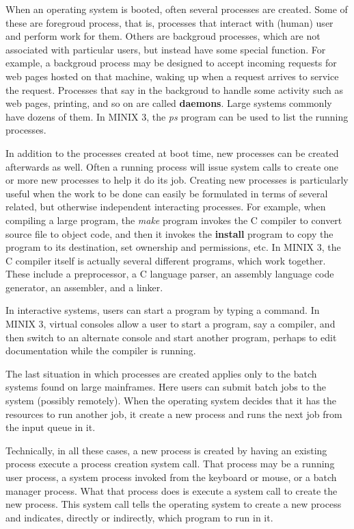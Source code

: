 \documentclass{book}
\newcommand {\kw}  [1] {\textbf{#1}}
\newcommand {\sys} [1] {\textsl{#1}}
\begin{document}
When an operating system is booted, often several processes are created.
Some of these are foregroud process, that is, processes that interact with (human) user and perform work for them.
Others are backgroud processes, which are not associated with particular users, but instead have some special function.
For example, a backgroud process may be designed to accept incoming requests for web pages hosted on that machine,
waking up when a request arrives to service the request.
Processes that say in the backgroud to handle some activity such as web pages, printing, and so on are called \kw{daemons}.
Large systems commonly have dozens of them.
In MINIX 3, the \sys{ps} program can be used to list the running processes.

In addition to the processes created at boot time, new processes can be created afterwards as well.
Often a running process will issue system calls to create one or more new processes to help it do its job.
Creating new processes is particularly useful when the work to be done can easily be formulated in terms of several related,
but otherwise independent interacting processes.
For example, when compiling a large program, the \sys{make} program invokes the C compiler to convert source file to object code,
and then it invokes the \kw{install} program to copy the program to its destination, 
set ownership and permissions, etc.
In MINIX 3, the C compiler itself is actually several different programs, which work together.
These include a preprocessor, a C language parser, an assembly language code generator, an assembler, and a linker.

In interactive systems, users can start a program by typing a command.
In MINIX 3, virtual consoles allow a user to start a program, say a compiler, 
and then switch to an alternate console and start another program,
perhaps to edit documentation while the compiler is running.

The last situation in which processes are created applies only to the batch systems found on large mainframes.
Here users can submit batch jobs to the system (possibly remotely).
When the operating system decides that it has the resources to run another job,
it create a new process and runs the next job from the input queue in it.

Technically, in all these cases, a new process is created by having an existing process execute a process creation system call.
That process may be a running user process, 
a system process invoked from the keyboard or mouse,
or a batch manager process.
What that process does is execute a system call to create the new process.
This system call tells the operating system to create a new process and indicates, directly or indirectly,
which program to run in it.
\end{document}
